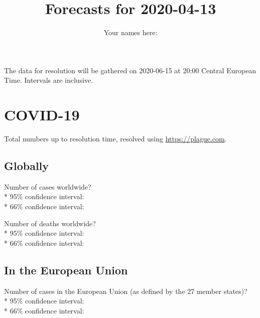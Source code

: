 \documentclass{article}
\title{Forecasts for 2020-04-13}
\begin{document}
\date{\vspace{-7ex}}

\author{Your names here: \underline{\hspace{10cm}}}

\maketitle

\vspace{0.5cm}

The data for resolution will be gathered on 2020-06-15 at 20:00 Central
European Time. Intervals are inclusive.

\section*{COVID-19}

Total numbers up to resolution time, resolved using
\href{https://plague.com/}{https://plague.com}.

\subsection*{Globally}

Number of cases worldwide?\\*
95\% confidence interval: \null\hfill\underline{\hspace{8cm}}\\*
66\% confidence interval: \null\hfill\underline{\hspace{8cm}}

\vspace{0.3cm}

Number of deaths worldwide?\\*
95\% confidence interval: \null\hfill\underline{\hspace{8cm}}\\*
66\% confidence interval: \null\hfill\underline{\hspace{8cm}}

\subsection*{In the European Union}

Number of cases in the European Union (as defined by the 27 member
states)?\\*
95\% confidence interval: \null\hfill\underline{\hspace{8cm}}\\*
66\% confidence interval: \null\hfill\underline{\hspace{8cm}}
\end{document}
